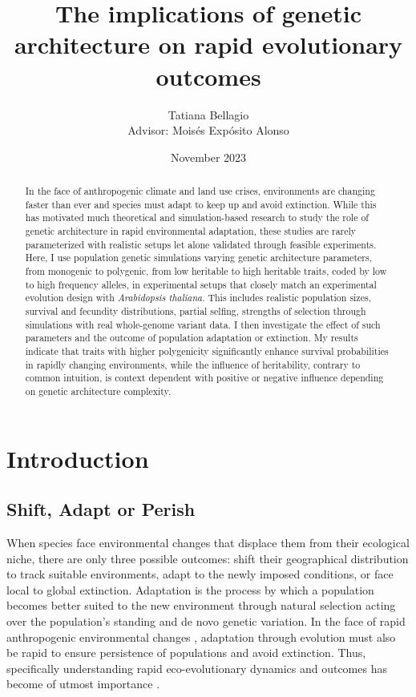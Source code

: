 \documentclass{article}
\title{The implications of genetic architecture on rapid evolutionary outcomes} %
\author{Tatiana Bellagio \\ Advisor: Moisés Expósito Alonso}
\date{November 2023}
\begin{document}
\maketitle

\begin{abstract}
In the face of anthropogenic climate and land use crises, environments are changing faster than ever and species must adapt to keep up and avoid extinction. While this has motivated much theoretical and simulation-based research to study the role of genetic architecture in rapid environmental adaptation, these studies are rarely parameterized with realistic setups let alone validated through feasible experiments. Here, I use population genetic simulations varying genetic architecture parameters, from monogenic to polygenic, from low heritable to high heritable traits, coded by low to high frequency alleles, in experimental setups that closely match an experimental evolution design with \textit{Arabidopsis thaliana}. This includes realistic population sizes, survival and fecundity distributions, partial selfing, strengths of selection through simulations with real whole-genome variant data. I then investigate the effect of such parameters and the outcome of population adaptation or extinction. My results indicate that traits with higher polygenicity significantly enhance survival probabilities in rapidly changing environments, while the influence of heritability, contrary to common intuition, is context dependent with positive or negative influence depending on genetic architecture complexity.
\end{abstract}

\tableofcontents
\newpage %

\section{Introduction}
\subsection{Shift, Adapt or Perish}
When species face environmental changes that displace them from their ecological niche, there are only three possible outcomes: shift their geographical distribution to track suitable environments, adapt to the newly imposed conditions, or face local to global extinction. Adaptation is the process by which a population becomes better suited to the new environment through natural selection acting over the population's standing and de novo genetic variation. In the face of rapid anthropogenic environmental changes \citep{IPCC2023}, adaptation through evolution must also be rapid to ensure persistence of populations and avoid extinction. Thus, specifically understanding rapid eco-evolutionary dynamics and outcomes has become of utmost importance \citep{Waldvogel2020-dh, Palumbi2002-li, Stockwell2003-da}. 
\end{document}
